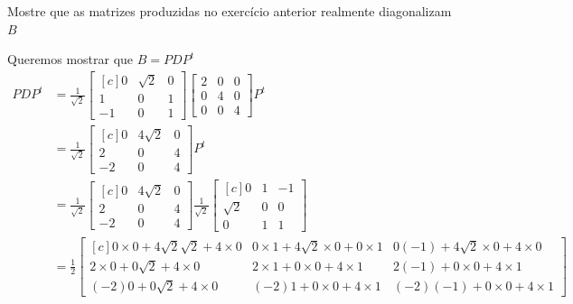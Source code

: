 \documentclass[a4paper,12pt,fleqn]{article}
\begin{document}
Mostre que as matrizes produzidas no exercício anterior realmente diagonalizam $B$

\begin{answer}
  Queremos mostrar que \(B = PDP^t\)
  \begin{align*}
    PDP^t
    & = \frac{1}{\sqrt{2}} \begin{bmatrix}[c]
      0  & \sqrt{2} & 0 \\
      1  & 0        & 1 \\
      -1 & 0        & 1
    \end{bmatrix}
    \begin{bmatrix}
      2 & 0 & 0 \\
      0 & 4 & 0 \\
      0 & 0 & 4
    \end{bmatrix} P^t
    \\
    & = \frac{1}{\sqrt{2}} \begin{bmatrix}[c]
       0  & 4\sqrt{2} & 0 \\
       2  & 0         & 4 \\
      -2  & 0         & 4
    \end{bmatrix} P^t
    \\
    & = \frac{1}{\sqrt{2}} \begin{bmatrix}[c]
       0  & 4\sqrt{2} & 0 \\
       2  & 0         & 4 \\
      -2  & 0         & 4
    \end{bmatrix}
    \frac{1}{\sqrt{2}} \begin{bmatrix}[c]
      0        & 1 & -1  \\
      \sqrt{2} & 0 &  0  \\
      0        & 1 &  1
    \end{bmatrix}
    \\
    & = \frac{1}{2} \begin{bmatrix}[c]
      0 \times 0  + 4\sqrt{2} \sqrt{2}  + 4 \times 0 &
      0 \times 1  + 4\sqrt{2} \times 0  + 0 \times 1 &
      0 (-1)      + 4\sqrt{2} \times 0  + 4 \times 0
      \\
      2 \times 0 + 0 \sqrt{2} + 4 \times 0 &
      2 \times 1 + 0 \times 0 + 4 \times 1 &
      2 (-1)     + 0 \times 0 + 4 \times 1
      \\
      (-2) 0   + 0 \sqrt{2} + 4 \times 0 &
      (-2) 1   + 0 \times 0 + 4 \times 1 &
      (-2)(-1) + 0 \times 0 + 4 \times 1

\end{bmatrix}
\end{align*}
\end{answer}
\end{document}
